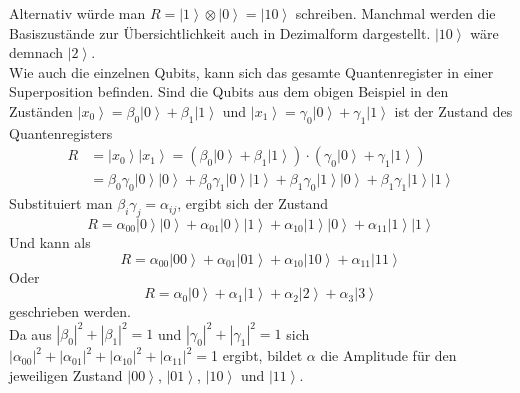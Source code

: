 Alternativ würde man $R=\left|1\right\rangle\otimes\left|0\right\rangle=\left|10\right\rangle$ schreiben. Manchmal werden die Basiszustände zur Übersichtlichkeit auch in Dezimalform dargestellt. $\left|10\right\rangle$ wäre demnach $\left|2\right\rangle$. \\

Wie auch die einzelnen Qubits, kann sich das gesamte Quantenregister in einer Superposition befinden. Sind die Qubits aus dem obigen Beispiel in den Zuständen 
$\left|\left.x_0\right\rangle\right.=\beta_0\left|\left.0\right\rangle\right.+\beta_1\left|\left.1\right\rangle\right.$ und $\left.\left|\left.x_1\right\rangle\right.=\gamma_0\left|\left.0\right\rangle\right.+\gamma_1\left|\left.1\right\rangle\right.\right.$
ist der Zustand des Quantenregisters 
\begin{align*}
    R&=\left|\left.x_0\right\rangle\right.\left|\left.x_1\right\rangle\right.=\left(\beta_0\left|\left.0\right\rangle\right.+\beta_1\left|\left.1\right\rangle\right.\right)\cdot(\gamma_0\left|\left.0\right\rangle\right.+\gamma_1\left|\left.1\right\rangle\right.)\\
    &=\beta_0\gamma_0\left.\left|0\right\rangle\left|0\right\rangle\right.+\beta_0\gamma_1\left|\left.0\right\rangle\left|\left.1\right\rangle\right.\right.+\beta_1\gamma_0\left|\left.1\right\rangle\right.\left|\left.0\right\rangle\right.+\beta_1\gamma_1\left|\left.1\right\rangle\right.\left|\left.1\right\rangle\right.
\end{align*}
Substituiert man $\beta_i\gamma_j=\alpha_{ij}$, ergibt sich der Zustand
$$R=\alpha_{00}\left|\left.0\right\rangle\right.\left|\left.0\right\rangle\right.+\alpha_{01}\left|\left.0\right\rangle\left|\left.1\right\rangle\right.\right.+\alpha_{10}\left|\left.1\right\rangle\right.\left|\left.0\right\rangle\right.+\alpha_{11}\left|\left.1\right\rangle\right.\left|\left.1\right\rangle\right.$$
Und kann als
$$R=\alpha_{00}\left|\left.00\right\rangle\right.+\alpha_{01}\left|\left.01\right\rangle\right.+\alpha_{10}\left|\left.10\right\rangle\right.+\alpha_{11}\left|\left.11\right\rangle\right.$$
Oder
$$R=\alpha_0\left|\left.0\right\rangle\right.+\alpha_1\left|\left.1\right\rangle\right.+\alpha_2\left|\left.2\right\rangle\right.+\alpha_3\left|\left.3\right\rangle\right.$$
geschrieben werden.\\

Da aus $\left|\beta_0\right|^2+\left|\beta_1\right|^2=1$ und $\left|\gamma_0\right|^2+\left|\gamma_1\right|^2=1$ sich $\left|\alpha_{00}\right|^2+\left|\alpha_{01}\right|^2+\left|\alpha_{10}\right|^2+\left|\alpha_{11}\right|^2=$1 ergibt, bildet $\alpha$ die Amplitude für den jeweiligen Zustand $\left|\left.00\right\rangle\right.$, $\left|\left.01\right\rangle\right.$, $\left|\left.10\right\rangle\right.$ und $\left|\left.11\right\rangle\right.$. \\

